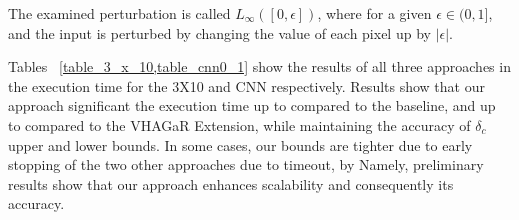 The examined perturbation is called $L_\infty([0,\epsilon])$, where for a given $\epsilon\in{(0,1]}$, and the input is perturbed by changing the value of each pixel up by $|\epsilon|$.

Tables ~\ref{table_3_x_10,table_cnn0_1} show the results of all three approaches in the execution time for the 3X10 and CNN respectively.
Results show that our approach significant the execution time up to  compared to the baseline, and up to  compared to the VHAGaR Extension, while maintaining the accuracy of $\delta_c$ upper and lower bounds. In some cases, our bounds are tighter due to early stopping of the two other approaches due to timeout, by 
Namely, preliminary results show that our approach enhances scalability and consequently its accuracy.

